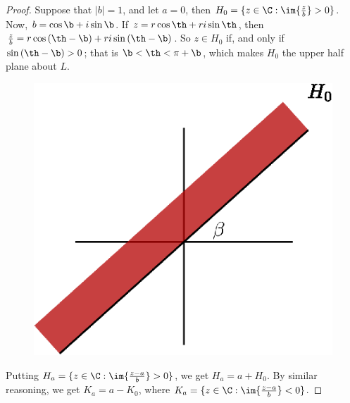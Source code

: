 \begin{proof}
    Suppose that $|b|=1$, and let  $a=0$, then  $H_0=\{z \in \C :
    \im{\frac{z}{b}} > 0\}$. Now, $b=\cos{\b}+i\sin{\b}$. If
    $z=r\cos{\th}+ri\sin{\th}$, then
    $\frac{z}{b}=r\cos{(\th-\b)}+ri\sin{(\th-\b)}$. So $z \in H_0$ if, and only
    if $\sin{(\th-\b)}>0$; that is $\b<\th<\pi+\b$, which makes  $H_0$ the upper
    half plane about $L$.
     \begin{figure}[h]
        \centering
        \includegraphics[scale=1]{Figures/chapter1/H_0.eps}
        \caption{}
        \label{}
    \end{figure}

    Putting $H_a=\{z \in \C : \im{\frac{z-a}{b}}>0\}$, we get $H_a=a+H_0$. By
    similar reasoning, we get $K_a=a-K_0$, where $K_a=\{z \in \C :
    \im{\frac{z-a}{b}}<0\}$.
\end{proof}

